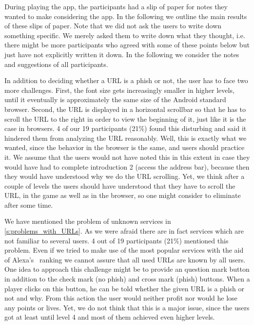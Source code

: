 During playing the app, the participants had a slip of paper for notes they wanted to make considering the app.
In the following we outline the main results of these slips of paper.
Note that we did not ask the users to write down something specific. 
We merely asked them to write down what they thought, i.e. there might be more participants who agreed with some of these points below but just have not explicitly written it down.
In the following we consider the notes and suggestions of all participants. 

\begin{description}[leftmargin=0cm]	
	\item[Scrolling of URL] In addition to deciding whether a URL is a phish or not, the user has to face two more 	challenges. 
First, the font size gets increasingly smaller in higher levels, until it eventually is approximately the same size of the Android standard browser.
Second, the URL is displayed in a horizontal scrollbar so that he has to scroll the URL to the right in order to view the beginning of it, just like it is the case in browsers.
4 of our 19 participants (21\%) found this disturbing and said it hindered them from analyzing the URL reasonably. 
Well, this is exactly what we wanted, since the behavior in the browser is the same, and users should practice it.
We assume that the users would not have noted this in this extent in case they would have had to complete introduction 2 (access the address bar), because then they would have understood why we do the URL scrolling.
Yet, we think after a couple of levels the users should have understood that they have to scroll the URL, in the game as well as in the browser, so one might consider to eliminate after some time. 
	\item[Unknown Services] We have mentioned the problem of unknown services in \autoref{s:problems_with_URLs}.
As we were afraid there are in fact services which are not familiar to several users.
4 out of 19 participants (21\%) mentioned this problem.
Even if we tried to make use of the most popular services with the aid of Alexa's~\cite{alexa} ranking we cannot assure that all used URLs are known by all users.
One idea to approach this challenge might be to provide an question mark button in addition to the check mark (no phish) and cross mark (phish) buttons. 
When a player clicks on this button, he can be told whether the given URL is a phish or not and why.
From this action the user would neither profit nor would he lose any points or lives.
Yet, we do not think that this is a major issue, since the users got at least until level 4 and most of them achieved even higher levels.

\end{description}
